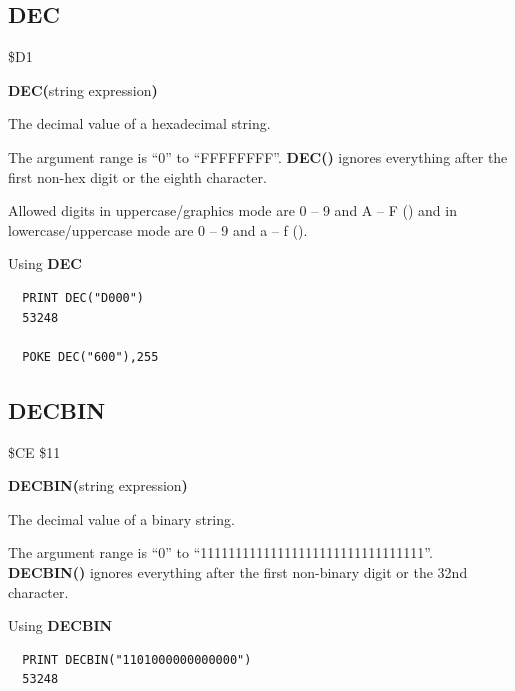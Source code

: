 \subsection{DEC}
\begin{description}[leftmargin=2cm,style=nextline]
\item [Token:] \$D1
\item [Format:] {\bf DEC(}string expression{\bf)}
\item [Returns:] The decimal value of a hexadecimal string.

               The argument range is ``0'' to ``FFFFFFFF''. {\bf DEC()}
               ignores everything after the first non-hex digit or the eighth
               character.

\item [Remarks:] Allowed digits in uppercase/graphics mode are 0 -- 9 and A -- F ()
                 and in lowercase/uppercase mode are 0 -- 9 and a -- f ().

\item [Example:] Using {\bf DEC}
\begin{tcolorbox}[colback=black,coltext=white]
\verbatimfont{\codefont}
\begin{verbatim}
  PRINT DEC("D000")
  53248

  POKE DEC("600"),255
\end{verbatim}
\end{tcolorbox}
\end{description}


\newpage
\subsection{DECBIN}
\begin{description}[leftmargin=2cm,style=nextline]
\item [Token:] \$CE \$11
\item [Format:] {\bf DECBIN(}string expression{\bf)}
\item [Returns:] The decimal value of a binary string.

               The argument range is ``0'' to ``11111111111111111111111111111111''. {\bf DECBIN()}
               ignores everything after the first non-binary digit or the 32nd
               character.

\item [Example:] Using {\bf DECBIN}
\begin{tcolorbox}[colback=black,coltext=white]
\verbatimfont{\codefont}
\begin{verbatim}
  PRINT DECBIN("1101000000000000")
  53248
\end{verbatim}
\end{tcolorbox}
\end{description}


